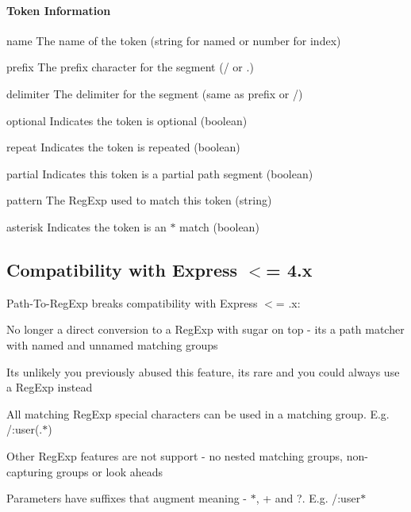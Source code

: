 \paragraph*{Token Information}


\begin{DoxyItemize}
\item {\ttfamily name} The name of the token ({\ttfamily string} for named or {\ttfamily number} for index)
\item {\ttfamily prefix} The prefix character for the segment ({\ttfamily /} or {\ttfamily .})
\item {\ttfamily delimiter} The delimiter for the segment (same as prefix or {\ttfamily /})
\item {\ttfamily optional} Indicates the token is optional ({\ttfamily boolean})
\item {\ttfamily repeat} Indicates the token is repeated ({\ttfamily boolean})
\item {\ttfamily partial} Indicates this token is a partial path segment ({\ttfamily boolean})
\item {\ttfamily pattern} The Reg\+Exp used to match this token ({\ttfamily string})
\item {\ttfamily asterisk} Indicates the token is an {\ttfamily $\ast$} match ({\ttfamily boolean})
\end{DoxyItemize}

\subsection*{Compatibility with Express $<$= 4.\+x}

Path-\/\+To-\/\+Reg\+Exp breaks compatibility with Express $<$= {.\+x}\+:


\begin{DoxyItemize}
\item No longer a direct conversion to a Reg\+Exp with sugar on top -\/ it\textquotesingle{}s a path matcher with named and unnamed matching groups
\begin{DoxyItemize}
\item It\textquotesingle{}s unlikely you previously abused this feature, it\textquotesingle{}s rare and you could always use a Reg\+Exp instead
\end{DoxyItemize}
\item All matching Reg\+Exp special characters can be used in a matching group. E.\+g. {\ttfamily /\+:user(.$\ast$)}
\begin{DoxyItemize}
\item Other Reg\+Exp features are not support -\/ no nested matching groups, non-\/capturing groups or look aheads
\end{DoxyItemize}
\item Parameters have suffixes that augment meaning -\/ {\ttfamily $\ast$}, {\ttfamily +} and {\ttfamily ?}. E.\+g. {\ttfamily /\+:user$\ast$}
\end{DoxyItemize}

